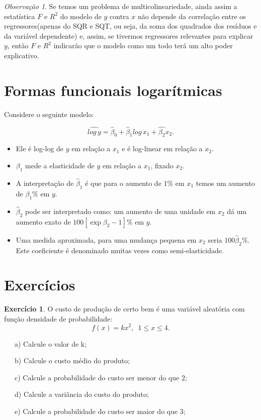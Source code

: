 \documentclass[
]{book}
\theoremstyle{definition}
\theoremstyle{definition}
\theoremstyle{definition}
\newtheorem{exercise}{Exercício}[chapter]
\theoremstyle{remark}
\newtheorem*{remark}{Observação}
\begin{document}
\begin{remark}
{}Se temos um problema de multicolineariedade, ainda assim a estatística \(F\) e \(R^2\) do modelo de \(y\) contra \(x\) não depende da correlação entre os regressores(apenas do SQR e SQT, ou seja, da soma dos quadrados dos resíduos e da variável dependente) e, assim, se tivermos regressores relevantes para explicar \(y\), então \(F\) e \(R^2\) indicarão que o modelo como um todo terá um alto poder explicativo.
\end{remark}

\hypertarget{formas-funcionais-logaruxedtmicas}{%
\section{Formas funcionais logarítmicas}\label{formas-funcionais-logaruxedtmicas}}

Considere o seguinte modelo:

\[\widehat{log\, y}=\hat{\beta}_0+\hat{\beta}_1log\,x_1+\hat{\beta_2}x_2.\]

\begin{itemize}
\item
  Ele é log-log de \(y\) em relação a \(x_1\) e é log-linear em relação a \(x_2\).
\item
  \(\beta_1\) mede a elasticidade de \(y\) em relação a \(x_1\), fixado \(x_2\).
\item
  A interpretação de \(\hat{\beta}_1\) é que para o aumento de 1\% em \(x_1\) temos um aumento de \(\beta_1\)\% em \(y\).
\item
  \(\hat{\beta}_2\) pode ser interpretado como: um aumento de uma unidade em \(x_2\) dá um aumento exato de \(100[\exp{\beta_2}-1]\)\% em \(y\).
\item
  Uma medida aproximada, para uma mudança pequena em \(x_2\) seria \(100\hat{\beta}_2\)\%. Este coeficiente é denominado muitas vezes como semi-elasticidade.
\end{itemize}

\newpage

\hypertarget{exercuxedcios}{%
\section{Exercícios}\label{exercuxedcios}}

\begin{exercise}
\protect\hypertarget{exr:exerint1}{}{\label{exr:exerint1} }O custo de produção de certo bem é uma variável aleatória com função densidade de probabilidade:
\begin{equation*}
f(x)= kx^2,\,\,\, 1\leq x \leq 4.
\end{equation*}

~~~a) Calcule o valor de k;

~~~b) Calcule o custo médio do produto;

~~~c) Calcule a probabilidade do custo ser menor do que 2;

~~~d) Calcule a variância do custo do produto;

~~~e) Calcule a probabilidade do custo ser maior do que 3;
\end{exercise}
\end{document}

